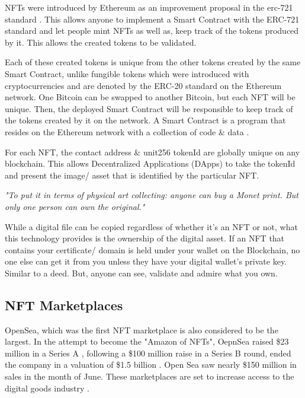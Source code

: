 NFTs were introduced by Ethereum \autocite{wood_ethereum_2014} as an improvement proposal \autocite{noauthor_eip-2309_nodate, noauthor_erc_nodate} in the \gls{erc}-721 standard \autocite{noauthor_erc-721_nodate}. This allows anyone to implement a Smart Contract with the ERC-721 standard and let people mint NFTs as well as, keep track of the tokens produced by it. This allows the created tokens to be validated.

Each of these created tokens is unique from the other tokens created by the same Smart Contract, unlike fungible tokens which were introduced with cryptocurrencies and are denoted by the ERC-20 standard \autocite{noauthor_erc-20_nodate} on the Ethereum network. One Bitcoin can be swapped to another Bitcoin, but each NFT will be unique.
Then, the deployed Smart Contract will be responsible to keep track of the tokens created by it on the network. A Smart Contract is a program that resides on the Ethereum network with a collection of code \& data \autocite{noauthor_introduction_nodate}.

For each NFT, the contact address \& unit256 tokenId are globally unique on any blockchain. This allows Decentralized Applications (DApps) \autocite{frankenfield_decentralized_nodate, noauthor_decentralized_2021} to take the tokenId and present the image/ asset that is identified by the particular NFT.

\emph{"To put it in terms of physical art collecting: anyone can buy a Monet print. But only one person can own the original."} \autocite{clark_people_2021}

While a digital file can be copied regardless of whether it's an NFT or not, what this technology provides is the ownership of the digital asset.
If an NFT that contains your certificate/ domain is held under your wallet on the Blockchain, no one else can get it from you unless they have your digital wallet's private key. Similar to a deed. But, anyone can see, validate and admire what you own.


\subsection{NFT Marketplaces}


OpenSea, which was the first NFT marketplace is also considered to be the largest. In the attempt to become the "Amazon of NFTs", OepnSea raised \$23 million in a Series A \autocite{hackett_this_2021}, following a \$100 million raise in a Series B round, ended the company in a valuation of \$1.5 billion \autocite{dfinzer_announcing_2021, matney_nft_2021}. Open Sea saw nearly \$150 million in sales in the month of June.
These marketplaces are set to increase access to the digital goods industry \autocite{chevet_blockchain_2018}.



